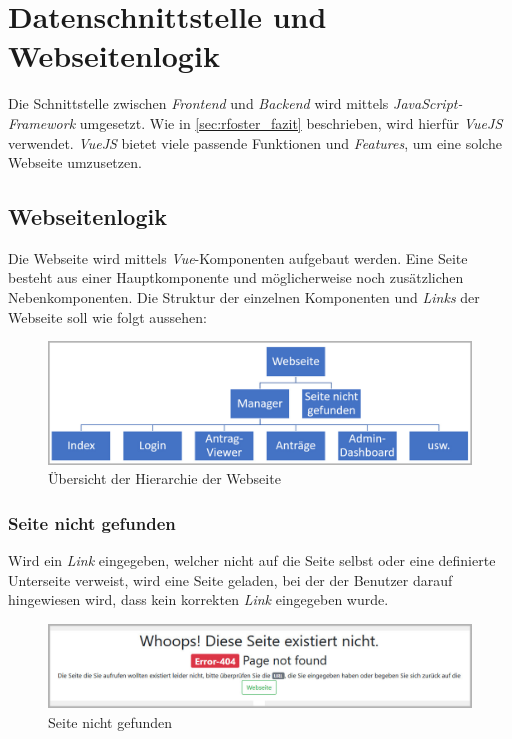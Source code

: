 \section{Datenschnittstelle und Webseitenlogik}
Die Schnittstelle zwischen \textit{Frontend} und \textit{Backend} wird mittels \textit{JavaScript-Framework} umgesetzt. Wie in \autoref{sec:rfoster_fazit} beschrieben, wird hierfür \textit{VueJS} verwendet. \textit{VueJS} bietet viele passende Funktionen und \textit{Features}, um  eine solche Webseite umzusetzen.
\subsection{Webseitenlogik}
\label{sec:webseitenlogik}
Die Webseite wird mittels \textit{Vue}-Komponenten aufgebaut werden. Eine Seite besteht aus einer Hauptkomponente und möglicherweise noch zusätzlichen Nebenkomponenten. Die Struktur der einzelnen Komponenten und \textit{Links} der Webseite soll wie folgt aussehen:
\begin{figure}[H]
	\centering
	\includegraphics[width=0.8\linewidth]{images/rfoster_konzept/Webseite_hierarchie}
	\caption[Hierarchie der Webseite]{Übersicht der Hierarchie der Webseite}
	\label{fig:webseitehierachie}
\end{figure}

\subsubsection{Seite nicht gefunden}
\label{sec:not_found}
Wird ein \textit{Link} eingegeben, welcher nicht auf die Seite selbst oder eine definierte Unterseite verweist, wird eine Seite geladen, bei der der Benutzer darauf hingewiesen wird, dass kein korrekten \textit{Link} eingegeben wurde.
\begin{figure}[H]
	\centering
	\includegraphics[width=0.6\linewidth]{images/rfoster_konzept/page_not_found}
	\caption[Seite nicht gefunden]{Seite nicht gefunden}
	\label{fig:pagenotfound}
\end{figure}

